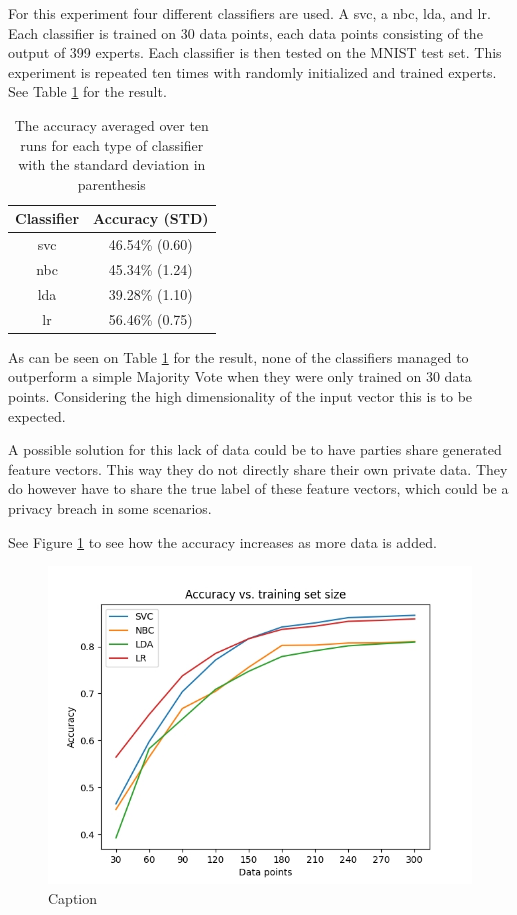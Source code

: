 For this experiment four different classifiers are used. A \acrfull{svc}, a \acrfull{nbc}, \acrfull{lda}, and \acrfull{lr}. Each classifier is trained on 30 data points, each data points consisting of the output of 399 experts. Each classifier is then tested on the MNIST test set. This experiment is repeated ten times with randomly initialized and trained experts. See Table \ref{tab:4-classifiers} for the result.

\begin{table}[]
    \centering
    \begin{tabular}{|c|c|}\hline
        Classifier      & Accuracy (STD) \\\hline
        \acrshort{svc}  & 46.54\% (0.60) \\
        \acrshort{nbc}  & 45.34\% (1.24) \\
        \acrshort{lda}  & 39.28\% (1.10) \\
        \acrshort{lr}   & 56.46\% (0.75) \\\hline
    \end{tabular}
    \caption{The accuracy averaged over ten runs for each type of classifier with the standard deviation in parenthesis}
    \label{tab:4-classifiers}
\end{table}

As can be seen on Table \ref{tab:4-classifiers} for the result, none of the classifiers managed to outperform a simple Majority Vote when they were only trained on 30 data points. Considering the high dimensionality of the input vector this is to be expected.

A possible solution for this lack of data could be to have parties share generated feature vectors.  This way they do not directly share their own private data. They do however have to share the true label of these feature vectors, which could be a privacy breach in some scenarios.

See Figure \ref{fig:acc-vs-data-clfs} to see how the accuracy increases as more data is added.

\begin{figure}
    \centering
    \includegraphics[width=0.9\linewidth]{figures/acc-vs-data-clfs.jpg}
    \caption{Caption}
    \label{fig:acc-vs-data-clfs}
\end{figure}
